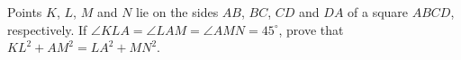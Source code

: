 \problem
Points $K$, $L$, $M$ and $N$ lie on the sides $AB$, $BC$, $CD$ and $DA$ of a
square $ABCD$, respectively.
If $\angle KLA = \angle LAM = \angle AMN = 45^\circ$, prove that
$KL^2 + AM^2 = LA^2 + MN^2$.
\solution
\endproblem
